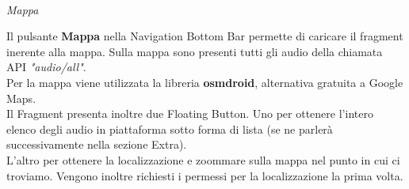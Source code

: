 \documentclass{article}
\begin{document}
\quad \vspace*{10pt}\\
\textit{Mappa}\\
\begin{minipage}[t]{0.6\textwidth}
    \raggedright
    \vspace*{20pt}
    Il pulsante \textbf{Mappa} nella Navigation Bottom Bar permette di caricare il fragment inerente alla mappa. Sulla mappa sono presenti tutti gli audio della chiamata API \textit{"audio/all"}.\\
    Per la mappa viene utilizzata la libreria \textbf{osmdroid}, alternativa gratuita a Google Maps.\vspace*{14pt}\\
    Il Fragment presenta inoltre due Floating Button. Uno per ottenere l'intero elenco degli audio in piattaforma sotto forma di lista (se ne parlerà successivamente nella sezione Extra).\\
    L'altro per ottenere la localizzazione e zoommare sulla mappa nel punto in cui ci troviamo. Vengono inoltre richiesti i permessi per la localizzazione la prima volta.
\end{minipage}
\hfill
\end{document}
